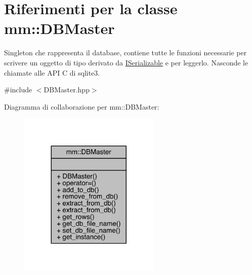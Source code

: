 \hypertarget{classmm_1_1_d_b_master}{}\section{Riferimenti per la classe mm\+:\+:D\+B\+Master}
\label{classmm_1_1_d_b_master}


Singleton che rappresenta il database, contiene tutte le funzioni necessarie per scrivere un oggetto di tipo derivato da \hyperlink{classmm_1_1_i_serializable}{I\+Serializable} e per leggerlo. Nasconde le chiamate alle A\+PI C di sqlite3.  




{\ttfamily \#include $<$D\+B\+Master.\+hpp$>$}



Diagramma di collaborazione per mm\+:\+:D\+B\+Master\+:\nopagebreak
\begin{figure}[H]
\begin{center}
\leavevmode
\includegraphics[width=191pt]{d7/d6f/classmm_1_1_d_b_master__coll__graph}
\end{center}
\end{figure}
